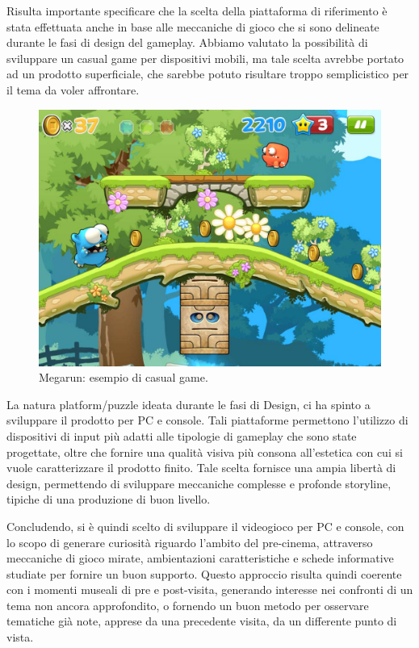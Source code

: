 Risulta importante specificare che la scelta della piattaforma di riferimento è stata effettuata anche in base alle meccaniche di gioco che si sono delineate durante le fasi di design del gameplay.
Abbiamo valutato la possibilità di sviluppare un casual game per dispositivi mobili, ma tale scelta avrebbe portato ad un prodotto superficiale, che sarebbe potuto risultare troppo semplicistico per il tema da voler affrontare.

\begin{figure}%
	\centering
	\includegraphics[width= 0.8\columnwidth]{images/gameDesign/01_megarun.jpg}
	\caption{Megarun: esempio di casual game.}
	\label{fig:casual_game}
\end{figure}

La natura platform/puzzle ideata durante le fasi di Design, ci ha spinto a sviluppare il prodotto per PC e console. Tali piattaforme permettono l’utilizzo di dispositivi di input più adatti alle tipologie di gameplay che sono state progettate, oltre che fornire una qualità visiva più consona all’estetica con cui si vuole caratterizzare il prodotto finito.
Tale scelta fornisce una ampia libertà di design, permettendo di sviluppare meccaniche complesse e profonde storyline, tipiche di una produzione di buon livello.

Concludendo, si è quindi scelto di sviluppare il videogioco per PC e console, con lo scopo di generare curiosità riguardo l’ambito del pre-cinema, attraverso meccaniche di gioco mirate, ambientazioni caratteristiche e schede informative studiate per fornire un buon supporto. Questo approccio risulta quindi coerente con i momenti museali di pre e post-visita, generando interesse nei confronti di un tema non ancora approfondito, o fornendo un buon metodo per osservare tematiche già note, apprese da una precedente visita, da un differente punto di vista.

